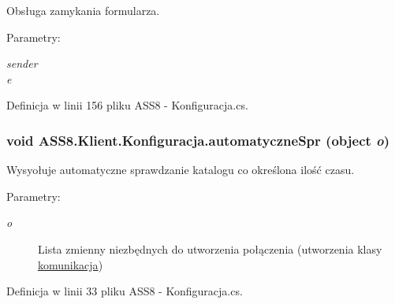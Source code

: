 Obsługa zamykania formularza. 

\begin{Desc}
\item[Parametry:]
\begin{description}
\item[{\em sender}]\item[{\em e}]\end{description}
\end{Desc}


Definicja w linii 156 pliku ASS8 - Konfiguracja.cs.\hypertarget{a00014_49a6172f91f2b718c2838960918afba7}{
\subsubsection[{automatyczneSpr}]{\setlength{\rightskip}{0pt plus 5cm}void ASS8.Klient.Konfiguracja.automatyczneSpr (object {\em o})}}
\label{d2/de7/a00014_49a6172f91f2b718c2838960918afba7}


Wysyołuje automatyczne sprawdzanie katalogu co określona ilość czasu. 

\begin{Desc}
\item[Parametry:]
\begin{description}
\item[{\em o}]Lista zmienny niezbędnych do utworzenia połączenia (utworzenia klasy \hyperlink{a00013}{komunikacja})\end{description}
\end{Desc}


Definicja w linii 33 pliku ASS8 - Konfiguracja.cs.

